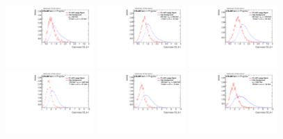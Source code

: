 \begin{figure}[H]
\bigskip
\includegraphics[width=0.3\textwidth]{sascha_input/Appendix/Distributions/w/distributions/beta1/h_recoJet_D2_bin1.pdf} \hspace{1mm}
\includegraphics[width=0.3\textwidth]{sascha_input/Appendix/Distributions/w/distributions/beta1/h_recoJet_D2_bin2.pdf} \hspace{1mm}
\includegraphics[width=0.3\textwidth]{sascha_input/Appendix/Distributions/w/distributions/beta1/h_recoJet_D2_bin3.pdf} 
\bigskip
\includegraphics[width=0.3\textwidth]{sascha_input/Appendix/Distributions/w/distributions/beta1/h_recoJet_D2_bin4.pdf} \hspace{1mm}
\includegraphics[width=0.3\textwidth]{sascha_input/Appendix/Distributions/w/distributions/beta1/h_recoJet_D2_bin5.pdf} \hspace{1mm}
\includegraphics[width=0.3\textwidth]{sascha_input/Appendix/Distributions/w/distributions/beta1/h_recoJet_D2_bin6.pdf}

\end{figure}
